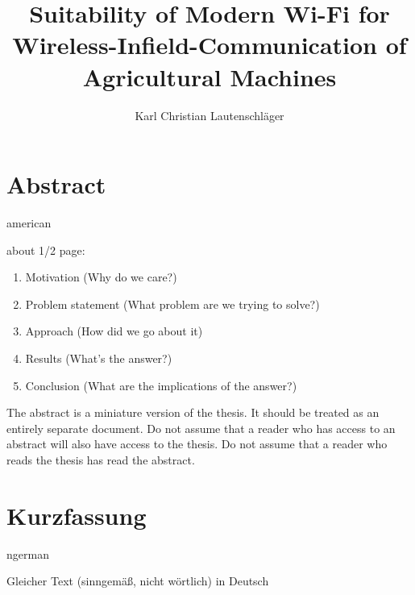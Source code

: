 \documentclass[]{nsm-thesis}
\author{Karl Christian Lautenschläger}
\title{Suitability of Modern Wi-Fi for Wireless-Infield-Communication of Agricultural	Machines}
\begin{document}

\maketitle

\cleardoublepage


\chapter*{Abstract}
\begin{otherlanguage*}{american}

about 1/2 page:
\begin{enumerate}
    \item Motivation (Why do we care?)
    \item Problem statement (What problem are we trying to solve?)
    \item Approach (How did we go about it)
    \item Results (What's the answer?)
    \item Conclusion (What are the implications of the answer?)
\end{enumerate}

The abstract is a miniature version of the thesis.
It should be treated as an entirely separate document.
Do not assume that a reader who has access to an abstract will also have access to the thesis.
Do not assume that a reader who reads the thesis has read the abstract.

\end{otherlanguage*}


\chapter*{Kurzfassung}
\begin{otherlanguage*}{ngerman}

Gleicher Text (sinngemäß, nicht wörtlich) in Deutsch

\end{otherlanguage*}
\acresetall

\cleardoublepage
\tableofcontents
{}
\end{document}
